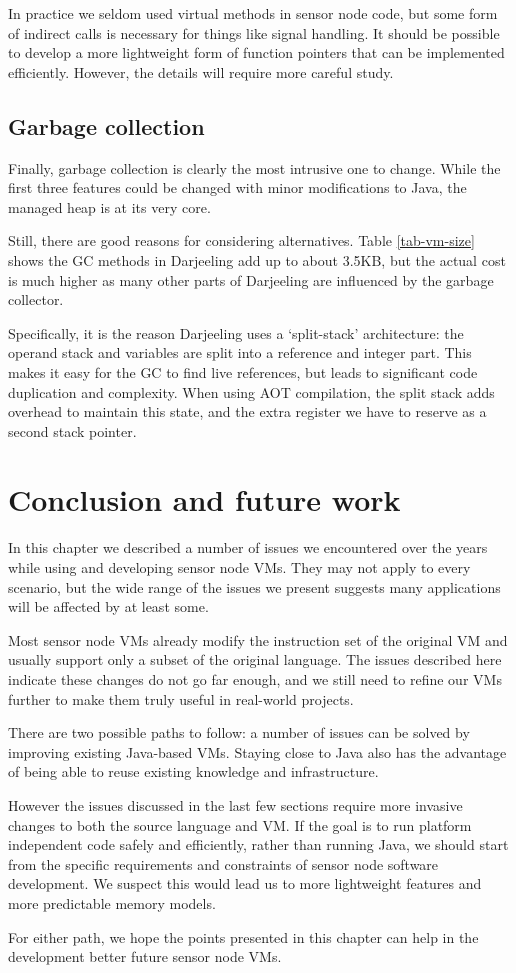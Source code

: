 In practice we seldom used virtual methods in sensor node code, but some form of indirect calls is necessary for things like signal handling. It should be possible to develop a more lightweight form of function pointers that can be implemented efficiently. However, the details will require more careful study.


\subsection{Garbage collection}
Finally, garbage collection is clearly the most intrusive one to change. While the first three features could be changed with minor modifications to Java, the managed heap is at its very core.

Still, there are good reasons for considering alternatives. Table \ref{tab-vm-size} shows the GC methods in Darjeeling add up to about 3.5KB, but the actual cost is much higher as many other parts of Darjeeling are influenced by the garbage collector.

Specifically, it is the reason Darjeeling uses a `split-stack' architecture: the operand stack and variables are split into a reference and integer part. This makes it easy for the GC to find live references, but leads to significant code duplication and complexity. When using AOT compilation, the split stack adds overhead to maintain this state, and the extra register we have to reserve as a second stack pointer.




\section{Conclusion and future work}
In this chapter we described a number of issues we encountered over the years while using and developing sensor node VMs. They may not apply to every scenario, but the wide range of the issues we present suggests many applications will be affected by at least some.

Most sensor node VMs already modify the instruction set of the original VM and usually support only a subset of the original language. The issues described here indicate these changes do not go far enough, and we still need to refine our VMs further to make them truly useful in real-world projects.

There are two possible paths to follow: a number of issues can be solved by improving existing Java-based VMs. Staying close to Java also has the advantage of being able to reuse existing knowledge and infrastructure.

However the issues discussed in the last few sections require more invasive changes to both the source language and VM. If the goal is to run platform independent code safely and efficiently, rather than running Java, we should start from the specific requirements and constraints of sensor node software development. We suspect this would lead us to more lightweight features and more predictable memory models.

For either path, we hope the points presented in this chapter can help in the development better future sensor node VMs.
